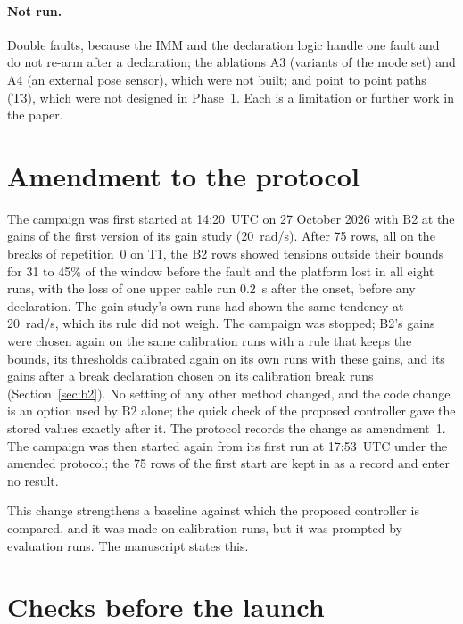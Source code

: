 \documentclass[10pt]{article}
\begin{document}
\paragraph{Not run.} Double faults, because the IMM and the declaration logic handle one fault and do not re-arm after a declaration; the ablations A3 (variants of the mode set) and A4 (an external pose sensor), which were not built; and point to point paths (T3), which were not designed in Phase~1. Each is a limitation or further work in the paper.

\section{Amendment to the protocol}\label{sec:amend}

The campaign was first started at 14:20~UTC on 27 October 2026 with B2 at the gains of the first version of its gain study (20~rad/s). After 75 rows, all on the breaks of repetition~0 on T1, the B2 rows showed tensions outside their bounds for 31 to 45\% of the window before the fault and the platform lost in all eight runs, with the loss of one upper cable run 0.2~s after the onset, before any declaration. The gain study's own runs had shown the same tendency at 20~rad/s, which its rule did not weigh. The campaign was stopped; B2's gains were chosen again on the same calibration runs with a rule that keeps the bounds, its thresholds calibrated again on its own runs with these gains, and its gains after a break declaration chosen on its calibration break runs (Section~\ref{sec:b2}). No setting of any other method changed, and the code change is an option used by B2 alone; the quick check of the proposed controller gave the stored values exactly after it. The protocol records the change as amendment~1. The campaign was then started again from its first run at 17:53~UTC under the amended protocol; the 75 rows of the first start are kept in  as a record and enter no result.

This change strengthens a baseline against which the proposed controller is compared, and it was made on calibration runs, but it was prompted by evaluation runs. The manuscript states this.

\section{Checks before the launch}\label{sec:checks}
\end{document}
